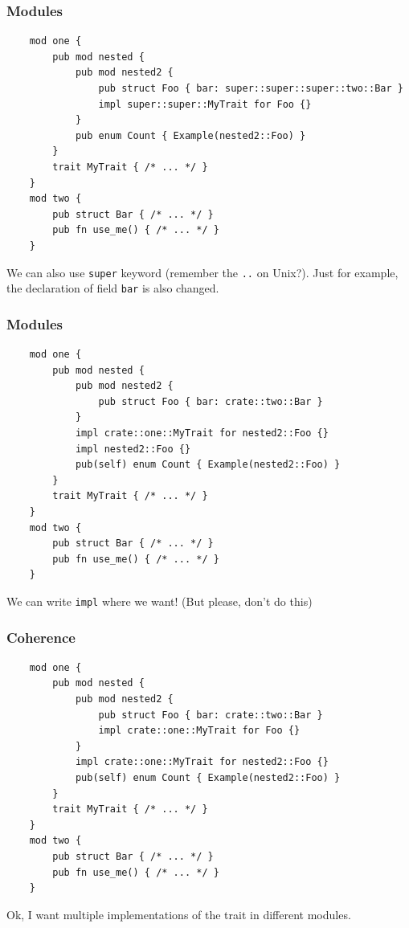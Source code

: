 \documentclass[aspectratio=1610,t]{beamer}
\begin{document}

\begin{frame}[fragile]
\frametitle{Modules}
\begin{verbatim}
    mod one {
        pub mod nested {
            pub mod nested2 {
                pub struct Foo { bar: super::super::super::two::Bar }
                impl super::super::MyTrait for Foo {}
            }
            pub enum Count { Example(nested2::Foo) }
        }
        trait MyTrait { /* ... */ }
    }
    mod two {
        pub struct Bar { /* ... */ }
        pub fn use_me() { /* ... */ }
    }
\end{verbatim}

We can also use \texttt{super} keyword (remember the \texttt{..} on Unix?). Just for example, the declaration of field \texttt{bar} is also changed.
\end{frame}


\begin{frame}[fragile]
\frametitle{Modules}
\begin{verbatim}
    mod one {
        pub mod nested {
            pub mod nested2 {
                pub struct Foo { bar: crate::two::Bar }
            }
            impl crate::one::MyTrait for nested2::Foo {}
            impl nested2::Foo {}
            pub(self) enum Count { Example(nested2::Foo) }
        }
        trait MyTrait { /* ... */ }
    }
    mod two {
        pub struct Bar { /* ... */ }
        pub fn use_me() { /* ... */ }
    }
\end{verbatim}

We can write \texttt{impl} where we want! (But please, don't do this)
\end{frame}


\begin{frame}[fragile]
\frametitle{Coherence}
\begin{verbatim}
    mod one {
        pub mod nested {
            pub mod nested2 {
                pub struct Foo { bar: crate::two::Bar }
                impl crate::one::MyTrait for Foo {}
            }
            impl crate::one::MyTrait for nested2::Foo {}
            pub(self) enum Count { Example(nested2::Foo) }
        }
        trait MyTrait { /* ... */ }
    }
    mod two {
        pub struct Bar { /* ... */ }
        pub fn use_me() { /* ... */ }
    }
\end{verbatim}

Ok, I want multiple implementations of the trait in different modules.
\end{frame}
\end{document}
